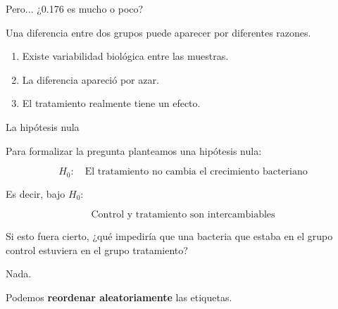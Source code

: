 \documentclass[11pt, aspectratio=169]{beamer}
\begin{document}
\begin{frame}{Pero... ¿0.176 es mucho o poco?}

Una diferencia entre dos grupos puede aparecer por diferentes razones.

\vspace{0.3cm}

\begin{enumerate}[<+->]
    \item Existe variabilidad biológica entre las muestras.
    \item La diferencia apareció por azar.
    \item El tratamiento realmente tiene un efecto.
\end{enumerate}

\vspace{0.5cm}


\end{frame}

\begin{frame}{La hipótesis nula}

Para formalizar la pregunta planteamos una hipótesis nula:


\pause

\[
H_0:
\quad
\text{El tratamiento no cambia el crecimiento bacteriano}
\]

Es decir, bajo $H_0$:

\[
\boxed{\text{Control y tratamiento son intercambiables}}
\]

\vspace{0.5cm}

Si esto fuera cierto, ¿qué impediría que una bacteria que estaba
en el grupo control estuviera en el grupo tratamiento?

\vspace{0.3cm}

\pause

Nada.

\begin{center}
\Large
Podemos \textbf{reordenar aleatoriamente} las etiquetas.
\end{center}

\end{frame}
\end{document}
